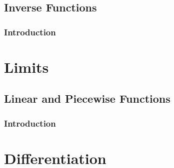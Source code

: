 \documentclass[11pt,fleqn,openany]{book} %
\begin{document}

\chapter{Inverse Functions}
\section{Introduction}
\lipsum[1]






\part{Limits}





\chapter{Linear and Piecewise Functions}
\section{Introduction}
\lipsum[1] 








\part{Differentiation}





\end{document}
